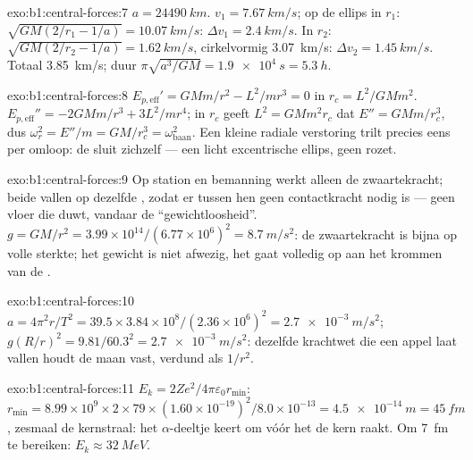 \begin{solution}{exo:b1:central-forces:7}
$a = \qty{24490}{km}$. $v_1 = \qty{7.67}{km/s}$; op de ellips in $r_1$:
$\sqrt{GM(2/r_1 - 1/a)} = \qty{10.07}{km/s}$: $\Delta v_1 = \qty{2.4}{km/s}$.
In $r_2$: $\sqrt{GM(2/r_2 - 1/a)} = \qty{1.62}{km/s}$, cirkelvormig
\qty{3.07}{km/s}: $\Delta v_2 = \qty{1.45}{km/s}$. Totaal \qty{3.85}{km/s};
duur $\pi\sqrt{a^3/GM} = \qty{1.9e4}{s} = \qty{5.3}{h}$.
\end{solution}

\begin{solution}{exo:b1:central-forces:8}
$E_{p,\mathrm{eff}}' = GMm/r^2 - L^2/mr^3 = 0$ in $r_c = L^2/GMm^2$.
$E_{p,\mathrm{eff}}'' = -2GMm/r^3 + 3L^2/mr^4$; in $r_c$ geeft $L^2 = GMm^2r_c$
dat $E'' = GMm/r_c^3$, dus $\omega_r^2 = E''/m = GM/r_c^3 = \omega_{\text{baan}}^2$.
Een kleine radiale verstoring trilt precies eens per omloop: de
 sluit zichzelf --- een licht excentrische ellips, geen rozet.
\end{solution}

\begin{solution}{exo:b1:central-forces:9}
Op station en bemanning werkt alleen de zwaartekracht; beide vallen op dezelfde
, zodat er tussen hen geen contactkracht nodig is --- geen vloer die duwt,
vandaar de ``gewichtloosheid''. $g = GM/r^2 = 3.99\times10^{14}/(6.77\times10^6)^2
= \qty{8.7}{m/s^2}$: de zwaartekracht is bijna op volle sterkte; het gewicht is niet
afwezig, het gaat volledig op aan het krommen van de .
\end{solution}

\begin{solution}{exo:b1:central-forces:10}
$a = 4\pi^2r/T^2 = 39.5 \times 3.84\times10^8/(2.36\times10^6)^2 =
\qty{2.7e-3}{m/s^2}$; $g(R/r)^2 = 9.81/60.3^2 = \qty{2.7e-3}{m/s^2}$: dezelfde
krachtwet die een appel laat vallen houdt de maan vast, verdund als $1/r^2$.
\end{solution}

\begin{solution}{exo:b1:central-forces:11}
$E_k = 2Ze^2/4\pi\varepsilon_0r_{\min}$: $r_{\min} = 8.99\times10^9 \times 2 \times 79
\times (1.60\times10^{-19})^2/8.0\times10^{-13} = \qty{4.5e-14}{m} = \qty{45}{fm}$,
zesmaal de kernstraal: het $\alpha$-deeltje keert om vóór het de kern raakt.
Om \qty{7}{fm} te bereiken: $E_k \approx \qty{32}{MeV}$.
\end{solution}

